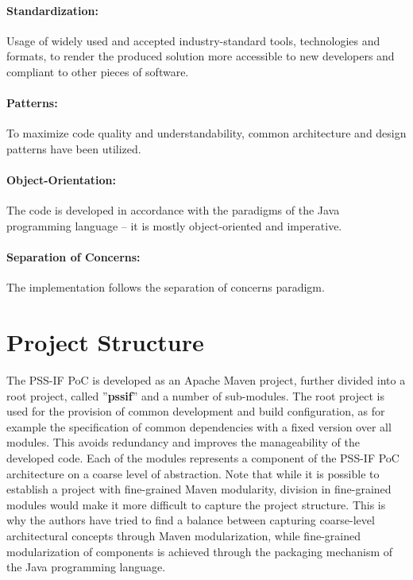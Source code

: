 \paragraph{Standardization:} Usage of widely used and accepted industry-standard tools, technologies and formats, to render the produced solution more accessible to new developers and compliant to other pieces of software.

\paragraph{Patterns:} To maximize code quality and understandability, common architecture and design patterns have been utilized.

\paragraph{Object-Orientation:} The code is developed in accordance with the paradigms of the Java programming language -- it is mostly object-oriented and imperative.

\paragraph{Separation of Concerns:} The implementation follows the separation of concerns paradigm.

\section{Project Structure}
\label{sec:impl:structure}

The PSS-IF PoC is developed as an Apache Maven project, further divided into a root project, called ''\textbf{pssif}'' and a number of sub-modules. The root project is used for the provision of common development and  build configuration, as for example the specification of common dependencies with a fixed version over all modules. This avoids redundancy and improves the manageability of the developed code. Each of the modules represents a component of the PSS-IF PoC architecture on a coarse level of abstraction. Note that while it is possible to establish a project with fine-grained Maven modularity, division in fine-grained modules would make it more difficult to capture the project structure. This is why the authors have tried to find a balance between capturing coarse-level architectural concepts through Maven modularization, while fine-grained modularization of components is achieved through the packaging mechanism of the Java programming language.

